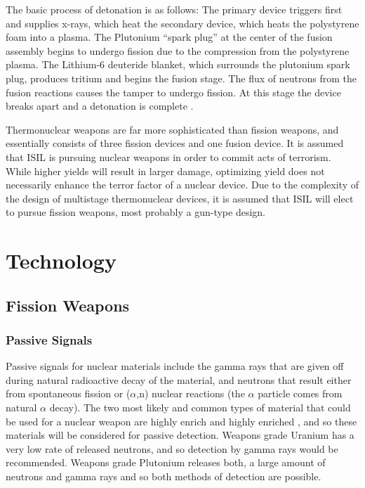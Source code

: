 \documentclass{report}
\begin{document}
The basic process of detonation is as follows: The primary device triggers first and supplies x-rays, which heat the secondary device, which heats the polystyrene foam into a plasma. The Plutonium \enquote{spark plug} at the center of the fusion assembly begins to undergo fission due to the compression from the polystyrene plasma. The Lithium-6 deuteride blanket, which surrounds the plutonium spark plug, produces tritium and begins the fusion stage. The flux of neutrons from the fusion reactions causes the  tamper to undergo fission. At this stage the device breaks apart and a detonation is complete \cite{Defense1998}. 

Thermonuclear weapons are far more sophisticated than fission weapons, and essentially consists of three fission devices and one fusion device. It is assumed that ISIL is pursuing nuclear weapons in order to commit acts of terrorism. While higher yields will result in larger damage,  optimizing yield does not necessarily enhance the terror factor of a nuclear device. Due to the complexity of the design of multistage thermonuclear devices, it is assumed that ISIL will elect to pursue  fission weapons, most probably a gun-type design. 







\chapter[Appendix E: Technology]{Technology} \label{app:tech}


\section{Fission Weapons}
 
   \subsection{Passive Signals}

Passive signals for nuclear materials include the gamma rays that are given off during natural radioactive decay of the material, and neutrons that result either from spontaneous fission or (\(\alpha\),n) nuclear reactions (the \(\alpha\) particle comes from natural \(\alpha\) decay). The two most likely and common types of material that could be used for a nuclear weapon are highly enrich  and highly enriched , and so these materials will be considered for passive detection. Weapons grade Uranium has a very low rate of released neutrons, and so detection by gamma rays would be recommended. Weapons grade Plutonium releases both, a large amount of neutrons and gamma rays and so both methods of detection are possible. 
\end{document}
